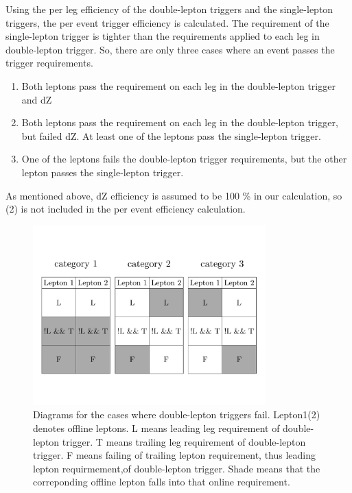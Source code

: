 Using the per leg efficiency of the double-lepton triggers and the single-lepton triggers, 
the per event trigger efficiency is calculated. The requirement of the 
single-lepton trigger is tighter than the requirements applied to each leg in 
double-lepton trigger. 
So, there are only three cases where an event passes the trigger requirements. 
\begin{enumerate}
\item Both leptons pass the requirement on each leg in the double-lepton trigger and dZ 
\item Both leptons pass the requirement on each leg in the double-lepton trigger, 
      but failed dZ. 
      At least one of the leptons pass the single-lepton trigger.
\item One of the leptons fails the double-lepton trigger requirements, 
      but the other lepton passes the single-lepton trigger.
\end{enumerate}
As mentioned above, dZ efficiency is assumed to be 100 \% in our calculation, 
so (2) is not included in the per event efficiency calculation.  
\begin{figure}[t]
\centering
\includegraphics[width=0.8\textwidth]{figures/TriggerEfficiencyDiagram.pdf}
\caption{ Diagrams for the cases where double-lepton triggers fail. Lepton1(2) 
denotes offline leptons. L means leading leg requirement of double-lepton trigger. 
T means trailing leg requirement of double-lepton trigger. F means failing of 
trailing lepton requirement, thus leading lepton requirmement,of double-lepton trigger.
Shade means that the correponding offline lepton falls into that online requirement.}
\label{fig:trg_eff_diagram}
\end{figure}
